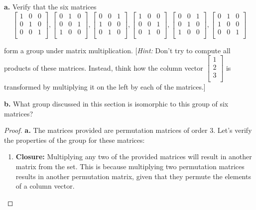 \documentclass[12pt]{amsart}
\theoremstyle{definition}
\numberwithin{equation}{section}
\theoremstyle{plain}
\begin{document}
\vspace*{20pt}
\begin{exercise}{21} \textbf{a.} Verify that the six matrices
    \[\begin{bmatrix}
        1&0&0\\
        0&1&0\\
        0&0&1\\
    \end{bmatrix},\begin{bmatrix}
        0&1&0\\
        0&0&1\\
        1&0&0\\
    \end{bmatrix},\begin{bmatrix}
        0&0&1\\
        1&0&0\\
        0&1&0\\
    \end{bmatrix},\begin{bmatrix}
        1&0&0\\
        0&0&1\\
        0&1&0\\
    \end{bmatrix},\begin{bmatrix}
        0&0&1\\
        0&1&0\\
        1&0&0\\
    \end{bmatrix},\begin{bmatrix}
        0&1&0\\
        1&0&0\\
        0&0&1\\
    \end{bmatrix}\]

    form a group under matrix multiplication. [\textit{Hint:} Don't try to compute all products of these matrices. Instead,
think how the column vector \(\begin{bmatrix} 1\\2\\3\\ \end{bmatrix}\) is transformed by multiplying it on the left by each of the matrices.]

\textbf{b.} What group discussed in this section is isomorphic to this group of six matrices?

\begin{proof}
\textbf{a.}
The matrices provided are permutation matrices of order 3. Let's verify the properties of the group for these matrices:
\begin{enumerate}
    \item \textbf{Closure:} Multiplying any two of the provided matrices will result in another matrix from the set. This is because multiplying two permutation matrices results in another permutation matrix, given that they permute the elements of a column vector.
    

\end{enumerate}
\end{proof}
\end{exercise}
\end{document}
